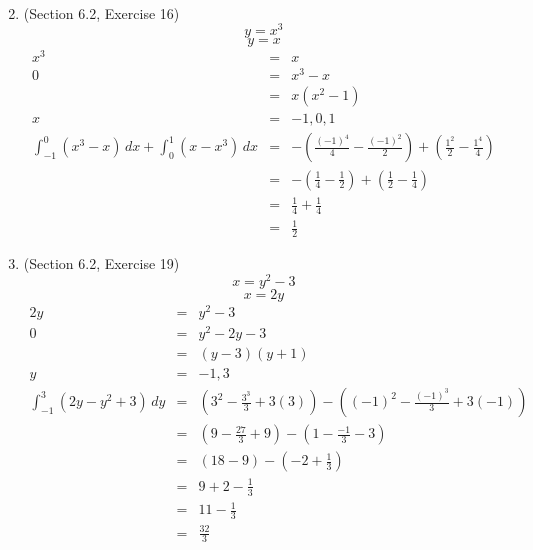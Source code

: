 \documentclass{article}
\begin{document}
\begin{enumerate}
\begin{eqnarray}
        \end{eqnarray}
    \item (Section 6.2, Exercise 16)
        $$y = x^3$$
        $$y = x$$
        \begin{eqnarray}
            x^3 &=& x \\
            0 &=& x^3 - x \\
              &=& x\left(x^2 - 1\right) \\
            x &=& -1, 0, 1 \\
            \int_{-1}^0{\left(x^3 - x\right)\,dx} + \int_0^1{\left(x - x^3\right)\,dx} &=& -\left(\frac{(-1)^4}{4} - \frac{(-1)^2}{2}\right) + \left(\frac{1^2}{2} - \frac{1^4}{4}\right) \\
                                                                                       &=& -\left(\frac{1}{4} - \frac{1}{2}\right) + \left(\frac{1}{2} - \frac{1}{4}\right) \\
                                                                                       &=& \frac{1}{4} + \frac{1}{4} \\
                                                                                       &=& \frac{1}{2}
        \end{eqnarray}
    \item (Section 6.2, Exercise 19)
        $$x = y^2 - 3$$
        $$x = 2y$$
        \begin{eqnarray}
            2y &=& y^2 - 3 \\
            0 &=& y^2 - 2y - 3 \\
              &=& \left(y - 3\right)\left(y + 1\right) \\
            y &=& -1, 3 \\
            \int_{-1}^3{\left(2y - y^2 + 3\right)\,dy} &=& \left(3^2 - \frac{3^3}{3} + 3(3)\right) - \left((-1)^2 - \frac{(-1)^3}{3} + 3(-1)\right) \\
                                                       &=& \left(9 - \frac{27}{3} + 9\right) - \left(1 - \frac{-1}{3} - 3\right) \\
                                                       &=& \left(18 - 9\right) - \left(-2 + \frac{1}{3}\right) \\
                                                       &=& 9 + 2 - \frac{1}{3} \\
                                                       &=& 11 - \frac{1}{3} \\
                                                       &=& \frac{32}{3}

\end{eqnarray}
\end{enumerate}
\end{document}
